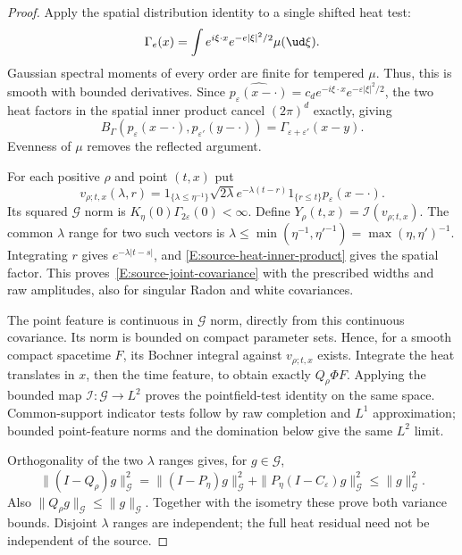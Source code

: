 \begin{proof}
  Apply the spatial distribution identity to a single shifted heat test:
  \[
    \Gamma_e(x)=\int e^{i\xi\cdot x}e^{-e|\xi|^2/2}\mu(\ud\xi).
  \]
  Gaussian spectral moments of every order are finite for tempered $\mu$.
  Thus, this is smooth with bounded derivatives. Since
  $\widehat{p_\varepsilon(x-\cdot)}
  =c_de^{-i\xi\cdot x}e^{-\varepsilon|\xi|^2/2}$, the two heat factors
  in the spatial inner product cancel $(2\pi)^d$ exactly, giving
  \begin{equation}\label{E:source-heat-inner-product}
    B_\Gamma(p_\varepsilon(x-\cdot),p_{\varepsilon'}(y-\cdot))
    =\Gamma_{\varepsilon+\varepsilon'}(x-y).
  \end{equation}
  Evenness of $\mu$ removes the reflected argument.

  For each positive $\rho$ and point $(t,x)$ put
  \begin{equation}\label{E:source-point-feature}
    v_{\rho;t,x}(\lambda,r)
    =1_{\{\lambda\le\eta^{-1}\}}\sqrt{2\lambda}
    e^{-\lambda(t-r)}1_{\{r\le t\}}p_\varepsilon(x-\cdot).
  \end{equation}
  Its squared $\mathcal G$ norm is
  $K_\eta(0)\Gamma_{2\varepsilon}(0)<\infty$.
  Define $Y_\rho(t,x)=\mathcal I(v_{\rho;t,x})$. The common $\lambda$
  range for two such vectors is
  $\lambda\le\min(\eta^{-1},\eta'^{-1})=\max(\eta,\eta')^{-1}$.
  Integrating $r$ gives $e^{-\lambda|t-s|}$, and
  \eqref{E:source-heat-inner-product} gives the spatial factor. This
  proves~\eqref{E:source-joint-covariance} with the prescribed widths and
  raw amplitudes, also for singular Radon and white covariances.

  The point feature is continuous in $\mathcal G$ norm, directly from
  this continuous covariance. Its norm is bounded on compact parameter
  sets. Hence, for a smooth compact spacetime $F$, its Bochner integral
  against $v_{\rho;t,x}$ exists. Integrate the heat translates in $x$,
  then the time feature, to obtain exactly $Q_\rho\Phi F$. Applying the
  bounded map $\mathcal I:\mathcal G\to L^2$ proves the pointfield-test
  identity on the same space. Common-support indicator tests follow by
  raw completion and $L^1$ approximation; bounded point-feature norms and
  the domination below give the same $L^2$ limit.

  Orthogonality of the two $\lambda$ ranges gives, for $g\in\mathcal G$,
  \[
    \|(I-Q_\rho)g\|_{\mathcal G}^2
    =\|(I-P_\eta)g\|_{\mathcal G}^2
    +\|P_\eta(I-C_\varepsilon)g\|_{\mathcal G}^2
    \le\|g\|_{\mathcal G}^2.
  \]
  Also $\|Q_\rho g\|_{\mathcal G}\le\|g\|_{\mathcal G}$. Together with
  the isometry these prove both variance bounds. Disjoint $\lambda$
  ranges are independent; the full heat residual need not be independent
  of the source.


\end{proof}
